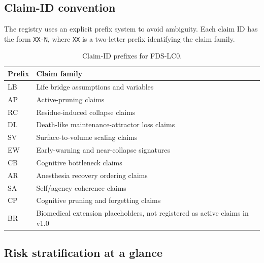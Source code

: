 \documentclass[10pt,a4paper,twocolumn,aps,prl]{revtex4-2}
\theoremstyle{claimstyle}
\theoremstyle{definition}
\newcommand{\LC}{FDS-LC0}
\begin{document}
\subsection{Claim-ID convention}

The registry uses an explicit prefix system to avoid ambiguity. Each claim ID has the form \texttt{XX-N}, where \texttt{XX} is a two-letter prefix identifying the claim family.

\begin{table}[t]
\centering
\small
\begin{tabular}{ll}
\toprule
Prefix & Claim family \\
\midrule
LB & Life bridge assumptions and variables \\
AP & Active-pruning claims \\
RC & Residue-induced collapse claims \\
DL & Death-like maintenance-attractor loss claims \\
SV & Surface-to-volume scaling claims \\
EW & Early-warning and near-collapse signatures \\
CB & Cognitive bottleneck claims \\
AR & Anesthesia recovery ordering claims \\
SA & Self/agency coherence claims \\
CP & Cognitive pruning and forgetting claims \\
BR & Biomedical extension placeholders, not registered as active claims in v1.0 \\
\bottomrule
\end{tabular}
\caption{Claim-ID prefixes for \LC.}
\end{table}

\subsection{Risk stratification at a glance}
\end{document}
